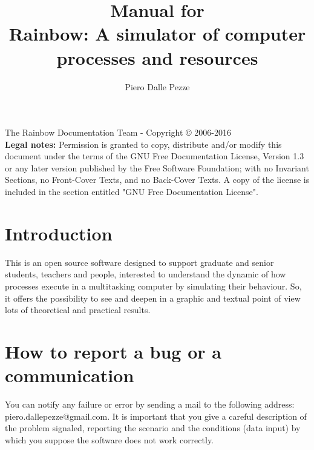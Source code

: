 \documentclass[10pt,a4paper,twoside,titlepage]{article}
\begin{document}
\begin{titlepage}
  \title{Manual for\\ Rainbow: A simulator of computer processes and resources}
  \author{Piero Dalle Pezze}    
\end{titlepage}

\maketitle


\newpage
The Rainbow Documentation Team - Copyright © 2006-2016 \\
\textbf{Legal notes:} Permission is granted to copy, distribute and/or modify this document under the terms of the GNU Free Documentation License, Version 1.3 or any later version published by the Free Software Foundation; with no Invariant Sections, no Front-Cover Texts, and no Back-Cover Texts. A copy of the license is included in the section entitled "GNU Free Documentation License".
\newpage



\tableofcontents
\listoffigures
\listoftables


\newpage



\section{Introduction}
\label{sec:introduction}
This is an open source software designed to support graduate and senior students, teachers and people, interested to understand the dynamic of how processes execute in a multitasking computer by simulating their behaviour. So, it offers the possibility to see and deepen in a graphic and textual point of view lots of theoretical and practical results. 



\section{How to report a bug or a communication}
\label{sec:how_to_report_a_bug_or_a_communication}
You can notify any failure or error by sending a mail to the following address: piero.dallepezze@gmail.com. It is important that you give a careful description of the problem signaled, reporting the scenario and the conditions (data input) by which you suppose the software does not work correctly.
\end{document}
